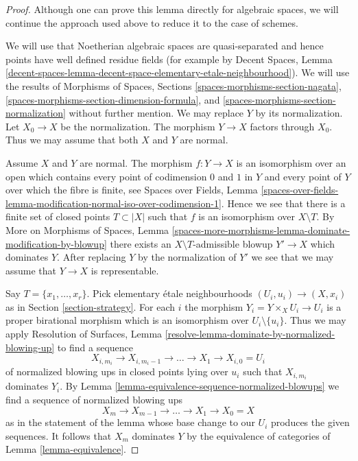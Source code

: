 \documentclass{stacks-project}
\theoremstyle{plain}
\theoremstyle{definition}
\theoremstyle{remark}
\numberwithin{equation}{subsection}
\begin{document}
\begin{proof}
Although one can prove this lemma directly for algebraic spaces,
we will continue the approach used above to reduce it to the case
of schemes.

\medskip\noindent
We will use that Noetherian algebraic spaces are quasi-separated
and hence points have well defined residue fields (for example by
Decent Spaces, Lemma
\ref{decent-spaces-lemma-decent-space-elementary-etale-neighbourhood}).
We will use the results of Morphisms of Spaces, Sections
\ref{spaces-morphisms-section-nagata},
\ref{spaces-morphisms-section-dimension-formula}, and
\ref{spaces-morphisms-section-normalization} without further mention.
We may replace $Y$ by its normalization. Let $X_0 \to X$ be the normalization.
The morphism $Y \to X$ factors through $X_0$.
Thus we may assume that both $X$ and $Y$ are normal.

\medskip\noindent
Assume $X$ and $Y$ are normal. The morphism $f : Y \to X$ is an isomorphism
over an open which contains every point of codimension $0$ and $1$ in $Y$ and
every point of $Y$ over which the fibre is finite, see
Spaces over Fields, Lemma
\ref{spaces-over-fields-lemma-modification-normal-iso-over-codimension-1}.
Hence we see that there is a finite set of closed points $T \subset |X|$
such that $f$ is an isomorphism over $X \setminus T$.
By More on Morphisms of Spaces, Lemma
\ref{spaces-more-morphisms-lemma-dominate-modification-by-blowup}
there exists an $X \setminus T$-admissible blowup $Y' \to X$
which dominates $Y$. After replacing $Y$ by the normalization of
$Y'$ we see that we may assume that $Y \to X$ is representable.

\medskip\noindent
Say $T = \{x_1, \ldots, x_r\}$. Pick elementary \'etale neighbourhoods
$(U_i, u_i) \to (X, x_i)$ as in Section \ref{section-strategy}.
For each $i$ the morphism $Y_i = Y \times_X U_i \to U_i$
is a proper birational morphism which is an isomorphism over
$U_i \setminus \{u_i\}$. Thus we may apply
Resolution of Surfaces, Lemma
\ref{resolve-lemma-dominate-by-normalized-blowing-up}
to find a sequence
$$
X_{i, m_i} \to X_{i, m_i - 1} \to \ldots \to X_1 \to X_{i, 0} = U_i
$$
of normalized blowing ups in closed points lying over $u_i$ such that
$X_{i, m_i}$ dominates $Y_i$.
By Lemma \ref{lemma-equivalence-sequence-normalized-blowups}
we find a sequence of normalized blowing ups
$$
X_m \to X_{m - 1} \to \ldots \to X_1 \to X_0 = X
$$
as in the statement of the lemma whose base change to our $U_i$
produces the given sequences. It follows that $X_m$ dominates
$Y$ by the equivalence of categories of
Lemma \ref{lemma-equivalence}.
\end{proof}
\end{document}
